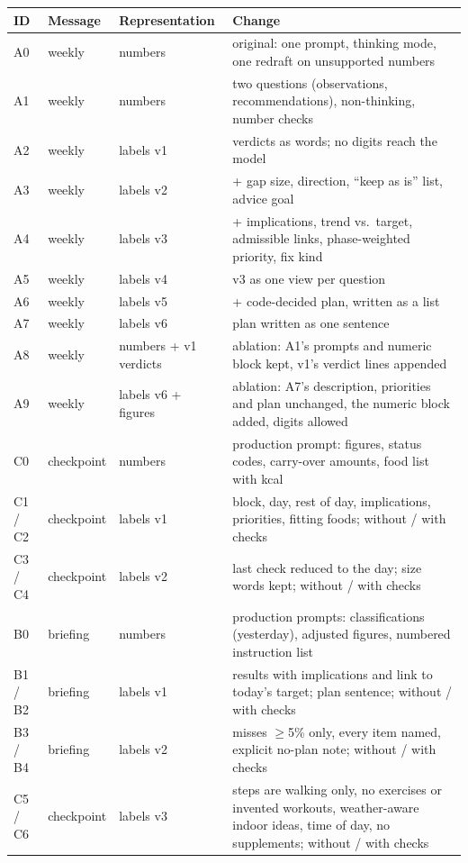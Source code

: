 \documentclass[10pt,twocolumn]{article}
\begin{document}
\begin{table}[t]
\centering\small
\begin{tabular}{@{}lllp{}@{}}
\toprule
ID & Message & Representation & Change\\
\midrule
A0 & weekly & numbers & original: one prompt, thinking mode, one redraft on unsupported numbers\\
A1 & weekly & numbers & two questions (observations, recommendations), non-thinking, number checks\\
A2 & weekly & labels v1 & verdicts as words; no digits reach the model\\
A3 & weekly & labels v2 & + gap size, direction, ``keep as is'' list, advice goal\\
A4 & weekly & labels v3 & + implications, trend vs.\ target, admissible links, phase-weighted priority, fix kind\\
A5 & weekly & labels v4 & v3 as one view per question\\
A6 & weekly & labels v5 & + code-decided plan, written as a list\\
A7 & weekly & labels v6 & plan written as one sentence\\
A8 & weekly & numbers + v1 verdicts & ablation: A1's prompts and numeric block kept, v1's verdict lines appended\\
A9 & weekly & labels v6 + figures & ablation: A7's description, priorities and plan unchanged, the numeric block added, digits allowed\\
\midrule
C0 & checkpoint & numbers & production prompt: figures, status codes, carry-over amounts, food list with kcal\\
C1 / C2 & checkpoint & labels v1 & block, day, rest of day, implications, priorities, fitting foods; without / with checks\\
C3 / C4 & checkpoint & labels v2 & last check reduced to the day; size words kept; without / with checks\\
\midrule
B0 & briefing & numbers & production prompts: classifications (yesterday), adjusted figures, numbered instruction list\\
B1 / B2 & briefing & labels v1 & results with implications and link to today's target; plan sentence; without / with checks\\
B3 / B4 & briefing & labels v2 & misses $\geq$5\% only, every item named, explicit no-plan note; without / with checks\\
C5 / C6 & checkpoint & labels v3 & steps are walking only, no exercises or invented workouts, weather-aware indoor ideas, time of day, no supplements; without / with checks\\

\end{tabular}
\end{table}
\end{document}
